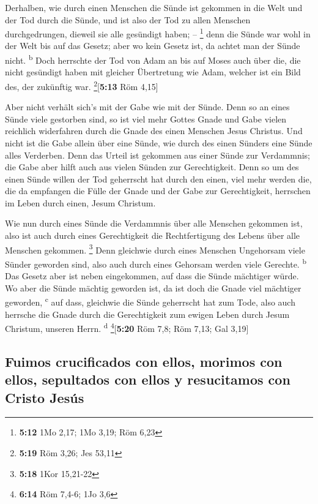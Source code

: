  Derhalben, wie durch einen Menschen die Sünde ist
gekommen in die Welt und der Tod durch die Sünde, und ist also der Tod
zu allen Menschen durchgedrungen, dieweil sie alle gesündigt haben; --
\footnote{\textbf{5:12} 1Mo 2,17; 1Mo 3,19; Röm 6,23} 
denn die Sünde war wohl in der Welt bis auf das Gesetz; aber wo kein
Gesetz ist, da achtet man der Sünde nicht. \textsuperscript{b}
 Doch herrschte der Tod von Adam an bis auf Moses auch
über die, die nicht gesündigt haben mit gleicher Übertretung wie Adam,
welcher ist ein Bild des, der zukünftig war. \footnote{\textbf{5:19} Röm
  3,26; Jes 53,11}{[}\textbf{5:13} Röm 4,15{]}

 Aber nicht verhält sich's mit der Gabe wie mit der
Sünde. Denn so an eines Sünde viele gestorben sind, so ist viel mehr
Gottes Gnade und Gabe vielen reichlich widerfahren durch die Gnade des
einen Menschen Jesus Christus.  Und nicht ist die Gabe
allein über eine Sünde, wie durch des einen Sünders eine Sünde alles
Verderben. Denn das Urteil ist gekommen aus einer Sünde zur Verdammnis;
die Gabe aber hilft auch aus vielen Sünden zur Gerechtigkeit.
 Denn so um des einen Sünde willen der Tod geherrscht hat
durch den einen, viel mehr werden die, die da empfangen die Fülle der
Gnade und der Gabe zur Gerechtigkeit, herrschen im Leben durch einen,
Jesum Christum.

 Wie nun durch eines Sünde die Verdammnis über alle
Menschen gekommen ist, also ist auch durch eines Gerechtigkeit die
Rechtfertigung des Lebens über alle Menschen gekommen. \footnote{\textbf{5:18}
  1Kor 15,21-22}  Denn gleichwie durch eines Menschen
Ungehorsam viele Sünder geworden sind, also auch durch eines Gehorsam
werden viele Gerechte. \textsuperscript{b}  Das Gesetz
aber ist neben eingekommen, auf dass die Sünde mächtiger würde. Wo aber
die Sünde mächtig geworden ist, da ist doch die Gnade viel mächtiger
geworden, \textsuperscript{c}  auf dass, gleichwie die
Sünde geherrscht hat zum Tode, also auch herrsche die Gnade durch die
Gerechtigkeit zum ewigen Leben durch Jesum Christum, unseren Herrn.
\textsuperscript{d} \footnote{\textbf{6:14} Röm 7,4-6; 1Jo 3,6}{[}\textbf{5:20}
Röm 7,8; Röm 7,13; Gal 3,19{]}

\hypertarget{fuimos-crucificados-con-ellos-morimos-con-ellos-sepultados-con-ellos-y-resucitamos-con-cristo-jesuxfas}{%
\subsection{Fuimos crucificados con ellos, morimos con ellos, sepultados
con ellos y resucitamos con Cristo
Jesús}\label{fuimos-crucificados-con-ellos-morimos-con-ellos-sepultados-con-ellos-y-resucitamos-con-cristo-jesuxfas}}

